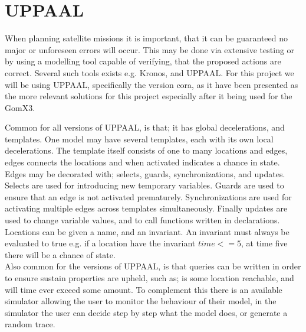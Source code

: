 \section{UPPAAL}
When planning satellite missions it is important, that it can be guaranteed no major or unforeseen errors will occur. This may be done via extensive testing or by using a modelling tool capable of verifying, that the proposed actions are correct\cite{cs_smc}. Several such tools exists e.g. Kronos, and UPPAAL. For this project we will be using UPPAAL, specifically the version \gls{cora}, as it have been presented as the more relevant solutions for this project especially after it being used for the GomX3\cite{gomx3}.

Common for all versions of UPPAAL, is that; it has global decelerations, and templates. One model may have several templates, each with its own local decelerations. The template itself consists of one to many locations and edges, edges connects the locations and when activated indicates a chance in state.\\
Edges may be decorated with; selects, guards, synchronizations, and updates. Selects are used for introducing new temporary variables. Guards are used to ensure that an edge is not activated prematurely. Synchronizations are used for activating multiple edges across templates simultaneously. Finally updates are used to change variable values, and to call functions written in declarations.\\
Locations can be given a name, and an invariant. An invariant must always be evaluated to true e.g. if a location have the invariant $time <= 5$, at time five there will be a chance of state.\\
Also common for the versions of UPPAAL, is that queries can be written in order to ensure sustain properties are upheld, such as; is some location reachable, and will time ever exceed some amount. To complement this there is an available simulator allowing the user to monitor the behaviour of their model, in the simulator the user can decide step by step what the model does, or generate a random trace.


